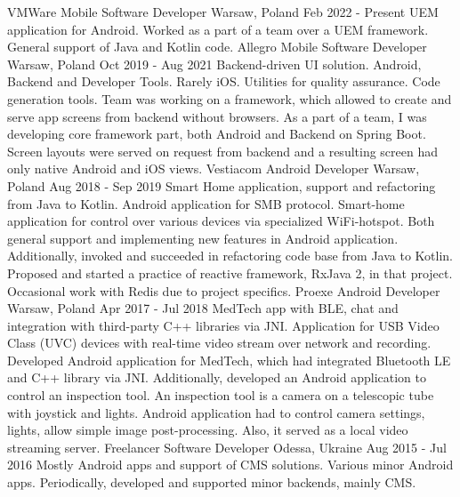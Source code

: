 
\cvexperience
  {VMWare}
  {Mobile Software Developer}
  {Warsaw, Poland}
  {Feb 2022 - Present}
  {
    UEM application for Android.
  }
  {
    Worked as a part of a team over a UEM framework. General support of Java and Kotlin code.
  }
\cvexperience
  {Allegro}
  {Mobile Software Developer}
  {Warsaw, Poland}
  {Oct 2019 - Aug 2021}
  {
    Backend-driven UI solution. Android, Backend and Developer Tools. Rarely iOS.
    \newline
    Utilities for quality assurance. Code generation tools.
  }
  {
    Team was working on a framework, which allowed to create and serve app screens from backend without browsers.
    \newline
    As a part of a team, I was developing core framework part, both Android and Backend on Spring Boot.
    \newline
    Screen layouts were served on request from backend and a resulting screen had only native Android and iOS views.      
  }
\cvexperience
  {Vestiacom}
  {Android Developer}
  {Warsaw, Poland}
  {Aug 2018 - Sep 2019}
  {
    Smart Home application, support and refactoring from Java to Kotlin.
    \newline
    Android application for SMB protocol.
  }
  {
    Smart-home application for control over various devices via specialized WiFi-hotspot.
    Both general support and implementing new features in Android application.
    Additionally, invoked and succeeded in refactoring code base from Java to Kotlin.
    \newline
    Proposed and started a practice of reactive framework, RxJava 2, in that project.
    Occasional work with Redis due to project specifics.
  }
\cvexperience
  {Proexe}
  {Android Developer}
  {Warsaw, Poland}
  {Apr 2017 - Jul 2018}
  {
    MedTech app with BLE, chat and integration with third-party C++ libraries via JNI.
    \newline
    Application for USB Video Class (UVC) devices with real-time video stream over network and recording.
  }
  {
    Developed Android application for MedTech, which had integrated Bluetooth LE and C++ library via JNI.
    \newline
    Additionally, developed an Android application to control an inspection tool.
    \newline
    An inspection tool is a camera on a telescopic tube with joystick and lights.
    \newline
    Android application had to control camera settings, lights, allow simple image post-processing.
    \newline
    Also, it served as a local video streaming server.
  }
\cvexperience
  {Freelancer}
  {Software Developer}
  {Odessa, Ukraine}
  {Aug 2015 - Jul 2016}
  {
    Mostly Android apps and support of CMS solutions.
  }
  {
    Various minor Android apps.
    \newline
    Periodically, developed and supported minor backends, mainly CMS.
  }

